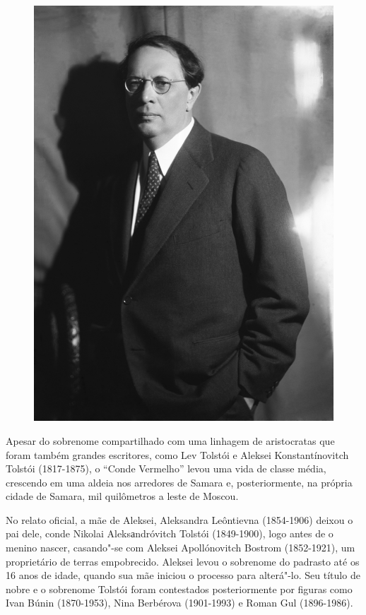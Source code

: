 \documentclass{article}
\begin{document}
\begin{figure}[ht!]
\includegraphics[width=\textwidth]{./images/PNLD0049-03.png}
\end{figure}

Apesar do sobrenome compartilhado com uma linhagem de aristocratas que
foram também grandes escritores, como Lev Tolstói e Aleksei
Konstantínovitch Tolstói (1817-1875), o ``Conde Vermelho'' levou uma
vida de classe média, crescendo em uma aldeia nos arredores de Samara e,
posteriormente, na própria cidade de Samara, mil quilômetros a leste de
Moscou.

No relato oficial, a mãe de Aleksei, Aleksandra Leôntievna (1854-1906)
deixou o pai dele, conde Nikolai Aleksаndróvitch Tolstói (1849-1900),
logo antes de o menino nascer, casando"-se com Aleksei Apollónovitch
Bostrom (1852-1921), um proprietário de terras empobrecido. Aleksei
levou o sobrenome do padrasto até os 16 anos de idade, quando sua mãe
iniciou o processo para alterá"-lo. Seu título de nobre e o sobrenome
Tolstói foram contestados posteriormente por figuras como Ivan Búnin
(1870-1953), Nina Berbérova (1901-1993) e Roman Gul (1896-1986).
\end{document}
